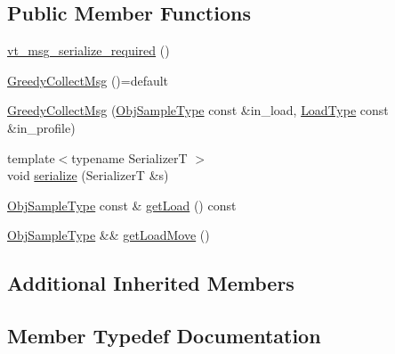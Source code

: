 \subsection*{Public Member Functions}
\begin{DoxyCompactItemize}
\item 
\hyperlink{structvt_1_1vrt_1_1collection_1_1lb_1_1_greedy_collect_msg_adf48bdb5542440ad7f1c958976f775da}{vt\+\_\+msg\+\_\+serialize\+\_\+required} ()
\item 
\hyperlink{structvt_1_1vrt_1_1collection_1_1lb_1_1_greedy_collect_msg_aed72919af1ca749e8502d892f8da495c}{Greedy\+Collect\+Msg} ()=default
\item 
\hyperlink{structvt_1_1vrt_1_1collection_1_1lb_1_1_greedy_collect_msg_ae619491c14d7adf736c32f14e90fdee1}{Greedy\+Collect\+Msg} (\hyperlink{structvt_1_1vrt_1_1collection_1_1lb_1_1_greedy_l_b_types_a467f8a79d0785fca5fc95bd5c0f406b9}{Obj\+Sample\+Type} const \&in\+\_\+load, \hyperlink{structvt_1_1vrt_1_1collection_1_1lb_1_1_greedy_l_b_types_a9fe8829bc0c92e88ddf9d149233a54f4}{Load\+Type} const \&in\+\_\+profile)
\item 
{\footnotesize template$<$typename SerializerT $>$ }\\void \hyperlink{structvt_1_1vrt_1_1collection_1_1lb_1_1_greedy_collect_msg_ac0f5ca855ef36a56595e6ab019cf9487}{serialize} (SerializerT \&s)
\item 
\hyperlink{structvt_1_1vrt_1_1collection_1_1lb_1_1_greedy_l_b_types_a467f8a79d0785fca5fc95bd5c0f406b9}{Obj\+Sample\+Type} const  \& \hyperlink{structvt_1_1vrt_1_1collection_1_1lb_1_1_greedy_collect_msg_a6455aa0e3d5468d08a801c679b2d2d80}{get\+Load} () const
\item 
\hyperlink{structvt_1_1vrt_1_1collection_1_1lb_1_1_greedy_l_b_types_a467f8a79d0785fca5fc95bd5c0f406b9}{Obj\+Sample\+Type} \&\& \hyperlink{structvt_1_1vrt_1_1collection_1_1lb_1_1_greedy_collect_msg_a83ba5b561927582a06451672f95999a4}{get\+Load\+Move} ()
\end{DoxyCompactItemize}
\subsection*{Additional Inherited Members}


\subsection{Member Typedef Documentation}
\mbox{\label{structvt_1_1vrt_1_1collection_1_1lb_1_1_greedy_collect_msg_a6e6be2a54d20566764aec3bb66d93c1e}} 
